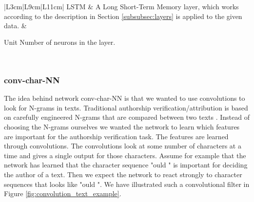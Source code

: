\begin{landscape}
\begin{table}
\begin{tabular}{|L{3cm}|L{9cm}|L{11cm}|}
            LSTM                                                               &
            A Long Short-Term Memory layer, which works according to the
            description in Section \ref{subsubsec:layers} is applied to the
            given data.                                                        &
            \begin{minipage}[t]{\linewidth}
            \begin{compactdesc}
                \item[Unit] Number of neurons in the layer.
            \end{compactdesc}
            \end{minipage}                                                    \\
            \hline
        \end{tabular}
    \end{table}
\end{landscape}


\subsubsection{\glsdesc{conv-char-NN}}
\label{subsubsec:conv_char_nn}

The idea behind network \gls{conv-char-NN} is that we wanted to use convolutions
to look for N-grams in texts. Traditional authorship verification/attribution
is based on carefully engineered N-grams that are compared between two texts
\citep{stamatos2009}. Instead of choosing the N-grams ourselves we wanted the
network to learn which features are important for the authorship verification
task. The features are learned through convolutions. The convolutions look
at some number of characters at a time and gives a single output for those
characters. Assume for example that the network has learned that the character
sequence "ould " is important for deciding the author of a text. Then we
expect the network to react strongly to character sequences that looks
like "ould ". We have illustrated such a convolutional filter in Figure
\ref{fig:convolution_text_example}.

